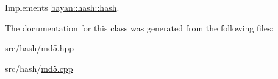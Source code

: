 Implements \hyperlink{classbayan_1_1hash_1_1hash_abc43a44f53acc0278f46a96438dc4cf3}{bayan\+::hash\+::hash}.



The documentation for this class was generated from the following files\+:\begin{DoxyCompactItemize}
\item 
src/hash/\hyperlink{md5_8hpp}{md5.\+hpp}\item 
src/hash/\hyperlink{md5_8cpp}{md5.\+cpp}\end{DoxyCompactItemize}
